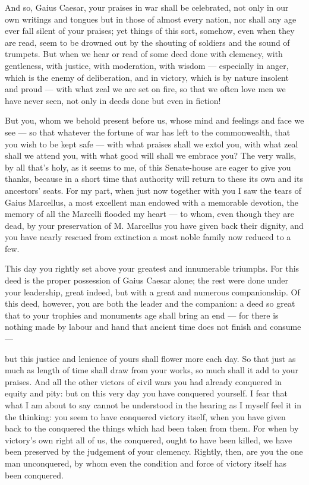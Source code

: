  And so, Gaius Caesar, your praises in war shall be celebrated, not only in our own writings and tongues but in those of almost every nation, nor shall any age ever fall silent of your praises; yet things of this sort, somehow, even when they are read, seem to be drowned out by the shouting of soldiers and the sound of trumpets. But when we hear or read of some deed done with clemency, with gentleness, with justice, with moderation, with wisdom --- especially in anger, which is the enemy of deliberation, and in victory, which is by nature insolent and proud --- with what zeal we are set on fire, so that we often love men we have never seen, not only in deeds done but even in fiction!

 But you, whom we behold present before us, whose mind and feelings and face we see --- so that whatever the fortune of war has left to the commonwealth, that you wish to be kept safe --- with what praises shall we extol you, with what zeal shall we attend you, with what good will shall we embrace you? The very walls, by all that's holy, as it seems to me, of this Senate-house are eager to give you thanks, because in a short time that authority will return to these its own and its ancestors' seats. For my part, when just now together with you I saw the tears of Gaius Marcellus, a most excellent man endowed with a memorable devotion, the memory of all the Marcelli flooded my heart --- to whom, even though they are dead, by your preservation of M. Marcellus you have given back their dignity, and you have nearly rescued from extinction a most noble family now reduced to a few.

 This day you rightly set above your greatest and innumerable triumphs. For this deed is the proper possession of Gaius Caesar alone; the rest were done under your leadership, great indeed, but with a great and numerous companionship. Of this deed, however, you are both the leader and the companion: a deed so great that to your trophies and monuments age shall bring an end --- for there is nothing made by labour and hand that ancient time does not finish and consume ---

 but this justice and lenience of yours shall flower more each day. So that just as much as length of time shall draw from your works, so much shall it add to your praises. And all the other victors of civil wars you had already conquered in equity and pity: but on this very day you have conquered yourself. I fear that what I am about to say cannot be understood in the hearing as I myself feel it in the thinking: you seem to have conquered victory itself, when you have given back to the conquered the things which had been taken from them. For when by victory's own right all of us, the conquered, ought to have been killed, we have been preserved by the judgement of your clemency. Rightly, then, are you the one man unconquered, by whom even the condition and force of victory itself has been conquered.

